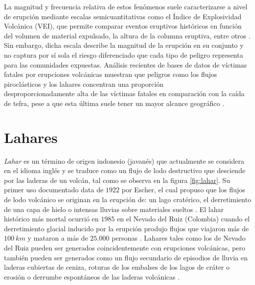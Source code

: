 La magnitud y frecuencia relativa de estos fenómenos suele caracterizarse a nivel de erupción mediante escalas semicuantitativas como el Índice de Explosividad Volcánica (VEI), que permite comparar eventos eruptivos históricos en función 
del volumen de material expulsado, la altura de la columna eruptiva, entre otros \cite{newhallself1982vei}. Sin embargo, dicha escala describe la magnitud de la erupción en su conjunto y no captura por sí sola el riesgo diferenciado que cada tipo de peligro 
representa para las comunidades expuestas. Análisis recientes de bases de datos de víctimas fatales por erupciones volcánicas muestran que peligros como los flujos piroclásticos y los lahares concentran una proporción \\	
desproporcionadamente alta de las víctimas fatales en comparación con la caída de tefra, pese a que esta última suele tener un mayor alcance geográfico \cite{brown2017volcanic}.

  

\section{Lahares}
\textit{Lahar} es un término de origen indonesio (javanés) que actualmente se considera en el idioma inglés y se traduce como un flujo de lodo destructivo que desciende por las laderas de un volcán, tal como se observa en la figura \ref{fig:lahar}. Su primer uso documentado data de $1922$ por Escher, el cual
propuso que los flujos de lodo volcánico se originan en la erupción de: un lago cratérico, el derretimiento de una capa de hielo o intensas lluvias sobre materiales sueltos \cite{neall1976lahars}. El lahar histórico más mortal ocurrió en $1985$ en el Nevado del Ruiz 
(Colombia) cuando el derretimiento glacial inducido por la erupción produjo flujos 
que viajaron más de $100\ km$ y mataron a más de $25{.}000$ personas \cite{lowe1986lahars}. Lahares tales como los de Nevado del Ruiz pueden ser generados coincidentemente con erupciones volcánicas, pero también pueden ser generados
como un flujo secundario de episodios de lluvia en laderas cubiertas de ceniza, roturas de los embalses de los lagos de cráter o erosión o derrumbe espontáneos de las
laderas volcánicas \cite{vallance2000lahars}.

